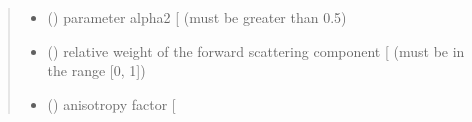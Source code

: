 \documentclass[letterpaper,10pt,english]{sphinxmanual}
\begin{document}
\begin{fulllineitems}
\begin{quote}
\begin{description}
\begin{itemize}
\item {} 
\sphinxAtStartPar
{} () \textendash{} parameter alpha2 {[}\sphinxhyphen{}{]} (must be greater than \sphinxhyphen{}0.5)

\item {} 
\sphinxAtStartPar
{} () \textendash{} relative weight of the forward scattering component {[}\sphinxhyphen{}{]} (must be in the range {[}0, 1{]})

\end{itemize}

\sphinxAtStartPar
\begin{itemize}
\item {} 
\sphinxAtStartPar
{} () \textendash{} anisotropy factor {[}\sphinxhyphen{}{]}

\end{itemize}


\end{description}\end{quote}

\end{fulllineitems}

\end{document}
